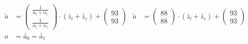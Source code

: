 \begin{align*}
%
\widetilde{a} &=
\begin{pmatrix}\frac{1}{\alpha_l+\alpha_r}\\
\frac{1}{\alpha_l+\alpha_r}\end{pmatrix}
\cdot (\widetilde{z_l} + \widetilde{z_r}) +
\begin{pmatrix}93\\93\end{pmatrix}
&
\widetilde{a} &=
\begin{pmatrix}88\\88\end{pmatrix}
\cdot (\widetilde{z_l} + \widetilde{z_r}) +
\begin{pmatrix}93\\93\end{pmatrix}\\
%
o &= \widetilde{a_0} = \widetilde{a_1} \\
\end{align*}\\

